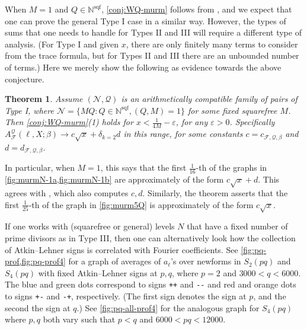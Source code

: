 \documentclass[11pt]{amsart}
\newcommand{\N}{\mathbb N}
\newcommand{\eps}{\varepsilon}
\newcommand{\sqf}{\mathrm{sqf}}
\numberwithin{lem}{section}
\newtheorem{thm}[lem]{Theorem}
\theoremstyle{remark}
\theoremstyle{definition}
\numberwithin{equation}{section}
\begin{document}
When $M=1$ and $Q \in \N^\sqf$, \cref{conj:WQ-murm} follows from \cite{zubrilina}, and we expect that one can prove the general Type I case in a similar way.  However, the types of sums that one needs to handle for Types II and III will require a different type of analysis.  (For Type I and given $x$, there are only finitely many terms to consider from the trace formula, but for Types II and III there are an unbounded number of terms.)  Here we merely show the following as evidence towards the above conjecture.

\begin{thm} \label{thm:WQ-murm} Assume $(\mathcal N, \mathcal Q)$ is an arithmetically compatible family of pairs of Type I, where $\mathcal N = \{ MQ : Q \in \mathbb N^\sqf, (Q, M) = 1 \}$ for some fixed squarefree $M$.  Then \cref{conj:WQ-murm}(1) holds for $x < \frac 1{4M} - \eps$, for any $\eps > 0$.  Specifically $A_{\mathcal F}^{\mathcal Q}(\ell, X; \beta) \to c \sqrt x + \delta_{k=2} d$ in this range, for some constants $c = c_{\mathcal F, \mathcal Q, \beta}$ and $d = d_{\mathcal F, \mathcal Q, \beta}$. 
\end{thm}

In particular, when $M=1$, this says that the first $\frac 1{16}$-th of the graphs in \cref{fig:murmN-1a,fig:murmN-1b} are approximately of the form $c \sqrt x + d$.  This agrees with \cite{zubrilina}, which also computes $c, d$.
Similarly, the theorem asserts that the first $\frac 1{25}$-th of the graph in \cref{fig:murm5Q} is approximately of the form $c \sqrt x$.


If one works with (squarefree or general) levels $N$ that have a fixed number of prime divisors as in Type III, then one can alternatively look how the collection of Atkin--Lehner signs is correlated with Fourier coefficients.  See \cref{fig:pq-prof,fig:pq-prof4} for a graph of averages of $a_\ell$'s over newforms in $S_2(pq)$ and $S_4(pq)$ with fixed Atkin--Lehner signs at $p, q$, where $p = 2$ and $3000 < q < 6000$.  The blue and green dots correspond to signs \verb|++| and \verb|--| and red and orange dots to signs \verb|+-| and \verb|-+|, respectively.  (The first sign denotes the sign at $p$, and the second the sign at $q$.)  See \cref{fig:pq-all-prof4} for the analogous graph for $S_4(pq)$ where $p, q$ both vary such that $p < q$ and $6000 < pq < 12000$.
\end{document}

